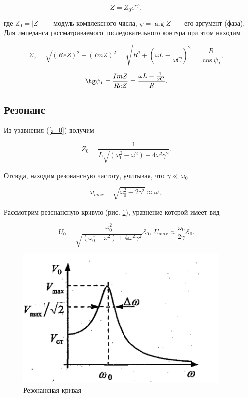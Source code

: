 \documentclass[a4paper, 12pt]{article}
\begin{document}
    \begin{equation}
        Z = Z_0 e^{i \psi},
    \end{equation}

    где $Z_0 = \lvert Z \rvert$ —- модуль комплексного числа, $\psi = \arg Z$ —- его аргумент (фаза). Для импеданса рассматриваемого последовательного контура при этом находим

    \begin{equation}
        Z_0 = \sqrt{\left(Re Z \right)^2 + \left(Im Z \right)^2} = \sqrt{R^2 + \left( \omega L - \frac{1}{\omega C} \right)^2} = \frac{R}{\cos \psi_I},
        \label{z_0}
    \end{equation}

    \begin{equation}
        \tg \psi_I = \frac{Im Z}{Re Z} = \frac{\omega L - \frac{1}{\omega C}}{R}.
    \end{equation}

    \subsection{Резонанс}

    Из уравнения (\ref{z_0}) получим

    \begin{equation}
        Z_0 = \frac{1}{L \sqrt{(\omega_0^2 - \omega^2)+ 4 \omega^2 \gamma^2}}.
    \end{equation}

    Отсюда, находим резонансную частоту, учитывая, что $\gamma \ll \omega_0$

    \begin{equation}
        \omega_{max} = \sqrt{\omega_0^2 - 2 \gamma^2} \approx \omega_0.
    \end{equation}

    Рассмотрим резонансную кривую (рис. \ref{resonance}), уравнение которой имеет вид

    \begin{equation}
        U_0 = \frac{\omega_0^2}{\sqrt{(\omega_0^2 - \omega^2)+ 4 \omega^2 \gamma^2}} \mathcal{E}_0, \: U_{max} \approx \frac{\omega_0}{2 \gamma} \mathcal{E}_0.
    \end{equation}

    \begin{figure}[H]
        \centering
        \includegraphics[scale = 0.9]{images/resonance.png}
        \caption{Резонансная кривая}
        \label{resonance}
    \end{figure}
\end{document}
